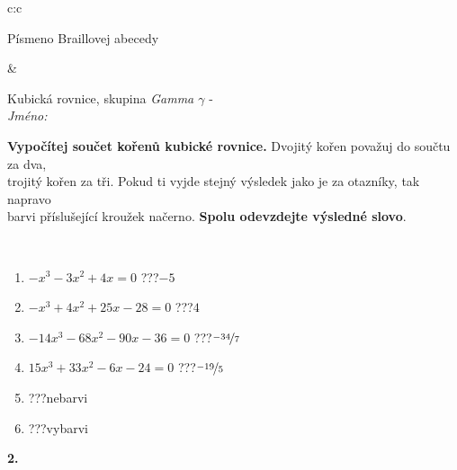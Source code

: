 \documentclass[10pt]{report}
\begin{document}
\begin{tabular}{c:c}
\begin{minipage}[c][104.5mm][t]{0.5\linewidth}
\begin{center}
\begin{minipage}{0.20\linewidth}
\begin{center}
{\small Písmeno Braillovej abecedy}
\end{center}
\end{minipage}
\end{center}
\end{minipage}
&
\begin{minipage}[c][104.5mm][t]{0.5\linewidth}
\begin{center}
\vspace{7mm}
{\huge Kubická rovnice, skupina \textit{Gamma $\gamma$} -}\\[5mm]
\textit{Jméno:}\phantom{xxxxxxxxxxxxxxxxxxxxxxxxxxxxxxxxxxxxxxxxxxxxxxxxxxxxxxxxxxxxxxxxx}\\[5mm]
\begin{minipage}{0.95\linewidth}
\begin{center}
\textbf{Vypočítej součet kořenů kubické rovnice.} Dvojitý kořen považuj do součtu za dva,\\trojitý kořen za tři. Pokud ti vyjde stejný výsledek jako je za otazníky, tak napravo\\barvi příslušející kroužek načerno. \textbf{Spolu odevzdejte výsledné slovo}.
\end{center}
\end{minipage}
\\[1mm]
\begin{minipage}{0.79\linewidth}
\begin{center}
\begin{varwidth}{\linewidth}
\begin{enumerate}
\Large
\item $-x^3-3x^2+4x=0$\quad \dotfill\; ???\;\dotfill \quad $-5$
\item $-x^3+4x^2+25x-28=0$\quad \dotfill\; ???\;\dotfill \quad $4$
\item $-14x^3-68x^2-90x-36=0$\quad \dotfill\; ???\;\dotfill \quad $\nicefrac{-34}{7}$
\item $15x^3+33x^2-6x-24=0$\quad \dotfill\; ???\;\dotfill \quad $\nicefrac{-19}{5}$
\item \quad \dotfill\; ???\;\dotfill \quad nebarvi
\item \quad \dotfill\; ???\;\dotfill \quad vybarvi
\end{enumerate}
\end{varwidth}
\end{center}
\end{minipage}
\begin{minipage}{0.20\linewidth}
\begin{center}
{\Huge\bfseries 2.} \\[2mm]

\end{center}
\end{minipage}
\end{center}
\end{minipage}
\end{tabular}
\end{document}
